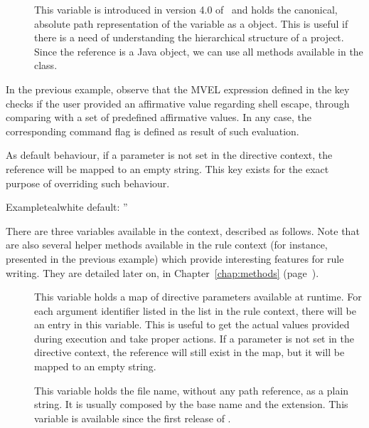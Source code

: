 \begin{description}
\begin{description}
\begin{description}
\item[] This variable is introduced in version 4.0 of \arara\ and holds the canonical, absolute path representation of the  variable as a  object. This is useful if there is a need of understanding the hierarchical structure of a project. Since the reference is a Java object, we can use all methods available in the  class.
\end{description}

In the previous example, observe that the MVEL expression defined in the  key checks if the user provided an affirmative value regarding shell escape, through comparing  with a set of predefined affirmative values. In any case, the corresponding command flag is defined as result of such evaluation.

\item[\describecontext{O}{arguments}{default}] As default behaviour, if a parameter is not set in the directive context, the reference will be mapped to an empty string. This key exists for the exact purpose of overriding such behaviour.

\begin{codebox}{Example}{teal}{\icnote}{white}
default: ''
\end{codebox}

There are three variables available in the  context, described as follows. Note that are also several helper methods available in the rule context (for instance,  presented in the previous example) which provide interesting features for rule writing. They are detailed later on, in Chapter~\ref{chap:methods} (page~\pageref{chap:methods}).

\begin{description}
\item[] This variable holds a map of directive parameters available at runtime. For each argument identifier listed in the  list in the rule context, there will be an entry in this variable. This is useful to get the actual values provided during execution and take proper actions. If a parameter is not set in the directive context, the reference will still exist in the map, but it will be mapped to an empty string.

\item[] This variable holds the file name, without any path reference, as a plain string. It is usually composed by the base name and the extension. This variable is available since the first release of \arara.


\end{description}
\end{description}
\end{description}
